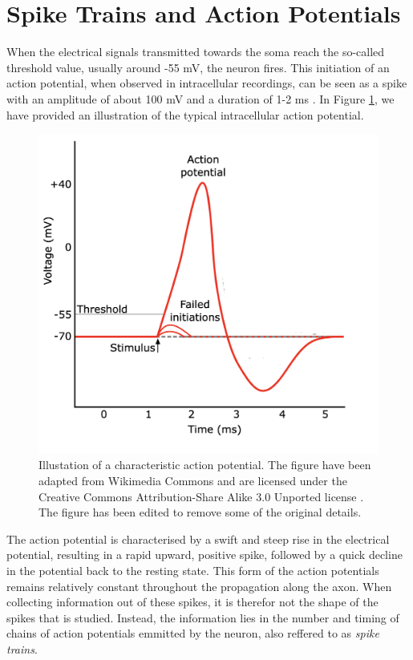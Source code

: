 \documentclass[a4paper, UKenglish, 11pt]{uiomaster}
\begin{document}
\section{Spike Trains and Action Potentials}

When the electrical signals transmitted towards the soma reach the so-called threshold value, usually around -55 mV, the neuron fires. This initiation of an action potential, when observed in intracellular recordings, can be seen as a spike with an amplitude of about 100 mV and a duration of 1-2 ms \cite{gerstner2014neuronal}. In Figure \ref{fig:action_potential}, we have provided an illustration of the typical intracellular action potential.


\begin{figure}
    \centering
    \includegraphics[width=0.8\linewidth]{figures/action_potential.png}
    \caption{Illustation of a characteristic action potential. The figure have been adapted from Wikimedia Commons and are licensed under the Creative Commons Attribution-Share Alike 3.0 Unported license \cite{wikimedia-action}. The figure has been edited to remove some of the original details.}
    \label{fig:action_potential}
\end{figure}

The action potential is characterised by a swift and steep rise in the electrical potential, resulting in a rapid upward, positive spike, followed by a quick decline in the potential back to the resting state. This form of the action potentials remains relatively constant throughout the propagation along the axon. When collecting information out of these spikes, it is therefor not the shape of the spikes that is studied. Instead, the information lies in the number and timing of chains of action potentials emmitted by the neuron, also reffered to as \emph{spike trains}.
\end{document}
